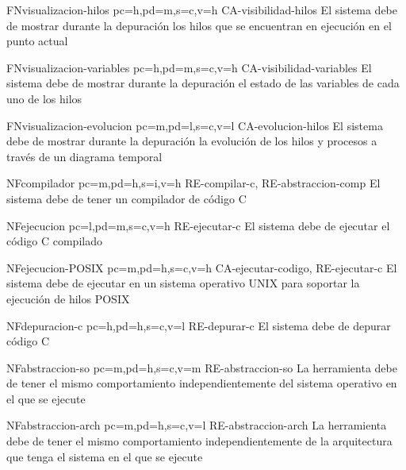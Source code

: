 \begin{softwareReq}{FN}{visualizacion-hilos}
    {pc=h,pd=m,s=c,v=h}
    {CA-visibilidad-hilos}
    El sistema debe de mostrar durante la depuración los hilos que se encuentran en ejecución en el punto actual
\end{softwareReq}

\begin{softwareReq}{FN}{visualizacion-variables}
    {pc=h,pd=m,s=c,v=h}
    {CA-visibilidad-variables}
    El sistema debe de mostrar durante la depuración el estado de las variables de cada uno de los hilos
\end{softwareReq}   

\begin{softwareReq}{FN}{visualizacion-evolucion}
    {pc=m,pd=l,s=c,v=l}
    {CA-evolucion-hilos}
    El sistema debe de mostrar durante la depuración la evolución de los hilos y procesos a través de un diagrama temporal
\end{softwareReq}

\begin{softwareReq}{NF}{compilador}
    {pc=m,pd=h,s=i,v=h}
    {RE-compilar-c, RE-abstraccion-comp}
    El sistema debe de tener un compilador de código C
\end{softwareReq}

\begin{softwareReq}{NF}{ejecucion}
    {pc=l,pd=m,s=c,v=h}
    {RE-ejecutar-c}
    El sistema debe de ejecutar el código C compilado
\end{softwareReq}

\begin{softwareReq}{NF}{ejecucion-POSIX}
    {pc=m,pd=h,s=c,v=h}
    {CA-ejecutar-codigo, RE-ejecutar-c}
    El sistema debe de ejecutar en un sistema operativo UNIX para soportar la ejecución de hilos POSIX 
\end{softwareReq}

\begin{softwareReq}{NF}{depuracion-c}
    {pc=h,pd=h,s=c,v=l}
    {RE-depurar-c}
    El sistema debe de depurar código C
\end{softwareReq}

\begin{softwareReq}{NF}{abstraccion-so}
    {pc=m,pd=h,s=c,v=m}
    {RE-abstraccion-so}
    La herramienta debe de tener el mismo comportamiento independientemente del sistema operativo en el que se ejecute
\end{softwareReq}

\begin{softwareReq}{NF}{abstraccion-arch}
    {pc=m,pd=h,s=c,v=l}
    {RE-abstraccion-arch}
    La herramienta debe de tener el mismo comportamiento independientemente de la arquitectura que tenga el sistema en el que se ejecute
\end{softwareReq} 

